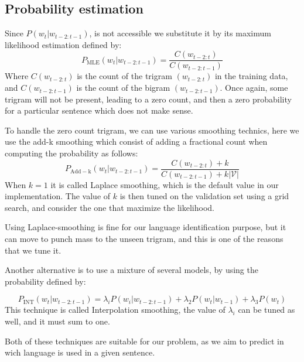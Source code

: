 \subsection{Probability estimation}
Since $P(w_t|w_{t-2:t-1})$, is not accessible we substitute it by its maximum likelihood estimation defined by:
\begin{equation}
    P_{\mathrm{MLE}}(w_t|w_{t-2:t-1}) = \frac{C(w_{t-2:t})}{C(w_{t-2:t-1})}
\end{equation}
Where $C(w_{t-2:t})$ is the count of the trigram $(w_{t-2:t})$ in the training data, and $C(w_{t-2:t-1})$ is the count of the bigram $(w_{t-2:t-1})$. Once again, some trigram will not be present, leading to a zero count, and then a zero probability for a particular sentence which does not make sense.

To handle the zero count trigram, we can use various smoothing technics, here we use the add-k smoothing which consist of adding a fractional count when computing the probability as follows:
    \begin{equation}
        P_{\mathrm{Add-k}}(w_t|w_{t-2:t-1}) = \frac{C(w_{t-2:t})+k}{C(w_{t-2:t-1})+k|\mathcal{V}|}
    \end{equation}
When $k=1$ it is called Laplace smoothing, which is the default value in our implementation. The value of $k$ is then tuned on the validation set using a grid search, and consider the one that maximize the likelihood.

Using Laplace-smoothing is fine for our language identification purpose, but it can move to punch mass to the unseen trigram, and this is one of the reasons that we tune it.

Another alternative is to use a mixture of several models, by using the probability defined by:

\begin{equation}
		P_{\mathrm{INT}}(w_t|w_{t-2:t-1}) =\lambda_iP(w_i|w_{t-2:t-1}) + \lambda_2P(w_t|w_{t-1}) + \lambda_3P(w_t)
\end{equation}
This technique is called Interpolation smoothing, the value of $\lambda_i$ can be tuned as well, and it must sum to one.

Both of these techniques are suitable for our problem, as we aim to predict in wich language is used in a given sentence.

